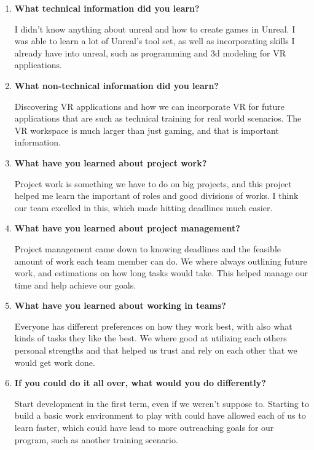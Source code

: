 \documentclass[onecolumn, draftclsnofoot,10pt, compsoc]{IEEEtran}
\begin{document}
\begin{enumerate}
    \item \textbf{What technical information did you learn?}
    
    I didn't know anything about unreal and how to create games in Unreal. I was able to learn a lot of Unreal's tool set, as well as incorporating skills I already have into unreal, such as programming and 3d modeling for VR applications.
    
    \item \textbf{What non-technical information did you learn?}
    
    Discovering VR applications and how we can incorporate VR for future applications that are such as technical training for real world scenarios. The VR workspace is much larger than just gaming, and that is important information.
    
    \item \textbf{What have you learned about project work?}
    
    Project work is something we have to do on big projects, and this project helped me learn the important of roles and good divisions of works. I think our team excelled in this, which made hitting deadlines much easier.
    
    \item \textbf{What have you learned about project management?}
    
    Project management came down to knowing deadlines and the feasible amount of work each team member can do. We where always outlining future work, and estimations on how long tasks would  take. This helped manage our time and help achieve our goals.
    
    \item \textbf{What have you learned about working in teams?}
    
    Everyone has different preferences on how they work best, with also what kinds of tasks they like the best. We where good at utilizing each others personal strengths and that helped us trust and rely on each other that we would get work done.
    
    \item \textbf{If you could do it all over, what would you do differently?}
    
    Start development in the first term, even if we weren't suppose to. Starting to build a basic work environment to play with could have allowed each of us to learn faster, which could have lead to more outreaching goals for our program, such as another training scenario.
    
\end{enumerate}
\end{document}
